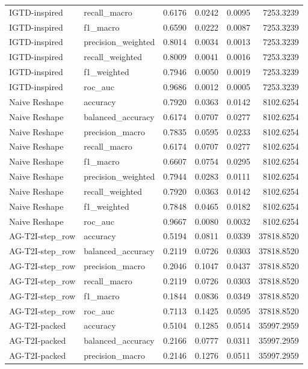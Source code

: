 \begin{tabular}{llrrrr}
IGTD-inspired & recall_macro & 0.6176 & 0.0242 & 0.0095 & 7253.3239 \\
IGTD-inspired & f1_macro & 0.6590 & 0.0222 & 0.0087 & 7253.3239 \\
IGTD-inspired & precision_weighted & 0.8014 & 0.0034 & 0.0013 & 7253.3239 \\
IGTD-inspired & recall_weighted & 0.8009 & 0.0041 & 0.0016 & 7253.3239 \\
IGTD-inspired & f1_weighted & 0.7946 & 0.0050 & 0.0019 & 7253.3239 \\
IGTD-inspired & roc_auc & 0.9686 & 0.0012 & 0.0005 & 7253.3239 \\
Naive Reshape & accuracy & 0.7920 & 0.0363 & 0.0142 & 8102.6254 \\
Naive Reshape & balanced_accuracy & 0.6174 & 0.0707 & 0.0277 & 8102.6254 \\
Naive Reshape & precision_macro & 0.7835 & 0.0595 & 0.0233 & 8102.6254 \\
Naive Reshape & recall_macro & 0.6174 & 0.0707 & 0.0277 & 8102.6254 \\
Naive Reshape & f1_macro & 0.6607 & 0.0754 & 0.0295 & 8102.6254 \\
Naive Reshape & precision_weighted & 0.7944 & 0.0283 & 0.0111 & 8102.6254 \\
Naive Reshape & recall_weighted & 0.7920 & 0.0363 & 0.0142 & 8102.6254 \\
Naive Reshape & f1_weighted & 0.7848 & 0.0465 & 0.0182 & 8102.6254 \\
Naive Reshape & roc_auc & 0.9667 & 0.0080 & 0.0032 & 8102.6254 \\
AG-T2I-step_row & accuracy & 0.5194 & 0.0811 & 0.0339 & 37818.8520 \\
AG-T2I-step_row & balanced_accuracy & 0.2119 & 0.0726 & 0.0303 & 37818.8520 \\
AG-T2I-step_row & precision_macro & 0.2046 & 0.1047 & 0.0437 & 37818.8520 \\
AG-T2I-step_row & recall_macro & 0.2119 & 0.0726 & 0.0303 & 37818.8520 \\
AG-T2I-step_row & f1_macro & 0.1844 & 0.0836 & 0.0349 & 37818.8520 \\
AG-T2I-step_row & roc_auc & 0.7113 & 0.1425 & 0.0595 & 37818.8520 \\
AG-T2I-packed & accuracy & 0.5104 & 0.1285 & 0.0514 & 35997.2959 \\
AG-T2I-packed & balanced_accuracy & 0.2166 & 0.0777 & 0.0311 & 35997.2959 \\
AG-T2I-packed & precision_macro & 0.2146 & 0.1276 & 0.0511 & 35997.2959 \\

\end{tabular}
